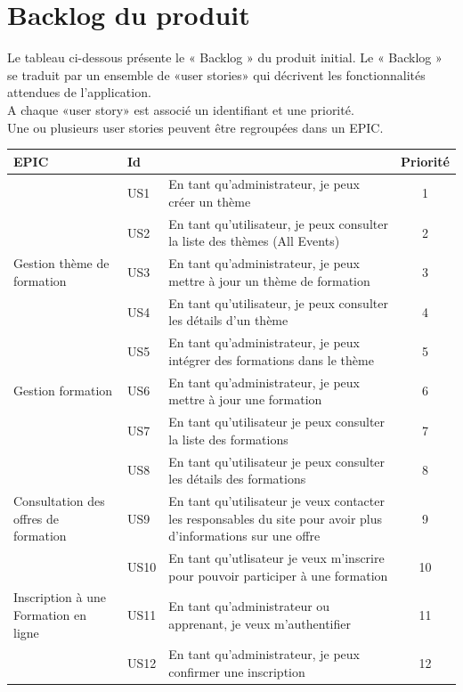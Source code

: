 \section{Backlog du produit}
Le tableau ci-dessous présente le « Backlog » du produit initial. Le « Backlog » se traduit par un
ensemble de «user stories» qui décrivent les fonctionnalités attendues de l’application.\\
A chaque «user story» est associé un identifiant et une priorité.\\
Une ou plusieurs user stories peuvent être regroupées dans un EPIC.
\begin{table}[!h]
	\centering %
	\begin{tabular}{|p{4cm}|p{1cm}|p{8.5cm}|c|}
		\hline
		\textbf{EPIC}&\textbf{Id} & \centering{\textbf{User Story}} & \textbf{Priorité}\tabularnewline
		\hline
		& US1  & En tant qu'administrateur, je peux créer un thème &1\\
		\cline{2-4}
		& US2  & En tant qu'utilisateur, je peux consulter la liste des thèmes (All Events) &2\\
		\cline{2-4}
		\multirow{-2}{2cm}{Gestion thème de formation}& US3&En tant qu'administrateur, je peux mettre à jour un thème de formation & 3\\
		\cline{2-4}
		& US4  & En tant qu'utilisateur, je peux consulter les détails d'un thème&4\\
		\cline{2-4}
		\hline
		
		& US5  & En tant qu'administrateur, je peux intégrer des formations dans le thème&5\\
		\cline{2-4}
		\multirow{-2}{2cm}{Gestion formation}& US6&En tant qu'administrateur, je peux mettre à jour une  formation & 6\\
		\hline
		& US7  & En tant qu'utilisateur je peux consulter la liste des
		formations&7\\
		\cline{2-4}
		& US8&En tant qu'utilisateur je peux consulter les détails des
		formations& 8\\
		\cline{2-4}
		\multirow{-3}{3cm}{Consultation des offres de formation}& US9  & 
		En tant qu'utilisateur je veux contacter les responsables du site
		pour avoir plus d’informations sur une offre&9\\
		\hline
		
	& US10&En tant qu'utlisateur je veux m’inscrire pour pouvoir participer à une formation & 10\\
		\cline{2-4}
			\multirow{-2}{4cm}{Inscription à une Formation en ligne}& US11&En tant qu'administrateur ou apprenant, je veux m'authentifier & 11\\
			\cline{2-4}
	& US12&En tant qu'administrateur, je peux confirmer une inscription& 12\\
	

\end{tabular}
\end{table}
